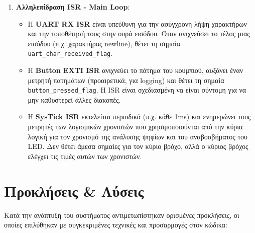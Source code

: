 \documentclass{article}
\begin{document}
\begin{enumerate}
    \item \textbf{Αλληλεπίδραση ISR - Main Loop}:
    \begin{itemize}
        \item Η \textbf{UART RX ISR} είναι υπεύθυνη για την ασύγχρονη λήψη χαρακτήρων και την τοποθέτησή τους στην ουρά εισόδου. Όταν ανιχνεύσει το τέλος μιας εισόδου (π.χ. χαρακτήρας newline), θέτει τη σημαία \texttt{uart\_char\_received\_flag}.
        \item Η \textbf{Button EXTI ISR} ανιχνεύει το πάτημα του κουμπιού, αυξάνει έναν μετρητή πατημάτων (προαιρετικά, για logging) και θέτει τη σημαία \texttt{button\_pressed\_flag}. Η ISR είναι σχεδιασμένη να είναι σύντομη για να μην καθυστερεί άλλες διακοπές.
        \item Η \textbf{SysTick ISR} εκτελείται περιοδικά (π.χ. κάθε 1ms) και ενημερώνει τους μετρητές των λογισμικών χρονιστών που χρησιμοποιούνται από την κύρια λογική για τον χρονισμό της ανάλυσης ψηφίων και του αναβοσβήματος του LED. Δεν θέτει άμεσα σημαίες για τον κύριο βρόχο, αλλά ο κύριος βρόχος ελέγχει τις τιμές αυτών των χρονιστών.
    \end{itemize}
\end{enumerate}

\section{Προκλήσεις & Λύσεις}
\label{sec:challenges}
Κατά την ανάπτυξη του συστήματος αντιμετωπίστηκαν ορισμένες προκλήσεις, οι οποίες επιλύθηκαν με συγκεκριμένες τεχνικές και προσαρμογές στον κώδικα:
\end{document}
